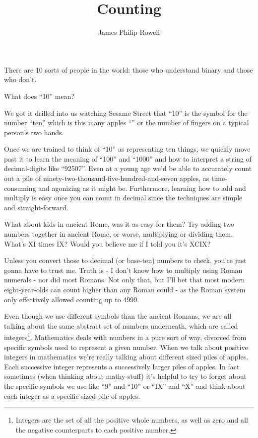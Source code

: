 \documentclass{article}
\title{Counting}
\author{James Philip Rowell}
\date{} %
\begin{document}
\maketitle
\begin{em}
\centerline{\small{}There are 10 sorts of people in the world: those who understand binary and those who don't.}
\end{em}
\bigskip

What does ``10'' mean?

We got it drilled into us watching Sesame Street that ``10'' is the symbol for the number
``\href{https://youtu.be/YcRBEqq-tGY?list=PLjBV4gvZoIcwHfhAWBmP6i7vEuqU6Q6vE}{ten}''
which is this many apples
``\faApple{}\faApple{}\faApple{}\faApple{}\faApple{}\faApple{}\faApple{}\faApple{}\faApple{}\faApple{}''
or the number of fingers on a typical person's two hands.

Once we are trained to think
of ``10'' as representing ten things, we quickly move past it to learn the meaning of ``100'' and ``1000''
and how to interpret a string of decimal-digits 
like ``92507''. Even at a young age we'd
be able to accurately count out a pile of
ninety-two-thousand-five-hundred-and-seven apples, as time-consuming and agonizing as it might be.
Furthermore, learning how to add and multiply is easy once you can count in
decimal since the techniques are simple and straight-forward.

What about kids in ancient Rome, was it as easy for them?
Try adding two numbers together in ancient Rome, or worse,
multiplying or dividing them.
What's XI times IX? Would you believe me if I told
you it's XCIX?

Unless you convert those to decimal (or base-ten) numbers to check,
you're just gonna have to trust me.
Truth is - I don't know how to multiply using Roman
numerals - nor did most Romans. Not only that,
but I'll bet that most modern eight-year-olds 
can count higher than any Roman could - as the
Roman system only effectively allowed counting up to 4999.

Even though we
use different symbols
than
the ancient Romans, we are all
talking about the same abstract set of numbers underneath,
which are called integers\footnote{Integers are 
the set of all the positive whole numbers, as well as zero and all the negative counterparts to each positive number.
}.
Mathematics deals with numbers in a pure sort of way, divorced from specific symbols
used to represent a given number.
When we talk about positive integers in mathematics
we're really talking about different sized piles of apples.
Each successive integer
represents a successively larger piles of apples. In fact sometimes (when thinking about mathy-stuff)
it's helpful to try to forget about the specific symbols
we use like ``9'' and ``10'' or ``IX'' and ``X'' and think about each integer as a specific sized pile
of apples.
\end{document}
